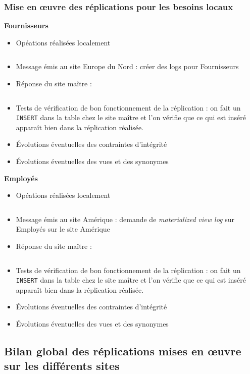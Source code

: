 \documentclass[10pt,a4paper]{article}
\theoremstyle{plain}
\begin{document}
\subsubsection{Mise en \oe uvre des réplications pour les besoins locaux}
\textbf{Fournisseurs}
\begin{itemize}
    \item Opéations réalisées localement
    \inputminted{sql}{EUS_V-A-5-a1.sql}
    \item Message émis au site Europe du Nord : créer des logs pour Fournisseurs 
    \item Réponse du site maître :
\inputminted{sql}{INSA-DB12-EuropeNord-rep-eu-n.sql}
    \item Tests de vérification de bon fonctionnement de la réplication : on fait un \verb|INSERT| dans la table chez le site maître et l'on vérifie que ce qui est inséré apparaît bien dans la réplication réalisée.
    \item Évolutions éventuelles des contraintes d'intégrité
    \item Évolutions éventuelles des vues et des synonymes
\end{itemize}

\textbf{Employés}
\begin{itemize}
    \item Opéations réalisées localement
    \inputminted{sql}{EUS_V-A-5-b1.sql}
    \item Message émis au site Amérique : demande de \emph{materialized view log} sur Employés sur le site Amérique
    \item Réponse du site maître : \inputminted{sql}{EUS_V-A-5-b3.sql}
    \item Tests de vérification de bon fonctionnement de la réplication : on fait un \verb|INSERT| dans la table chez le site maître et l'on vérifie que ce qui est inséré apparaît bien dans la réplication réalisée.
    \item Évolutions éventuelles des contraintes d'intégrité
    \item Évolutions éventuelles des vues et des synonymes
\end{itemize}

\subsection{Bilan global des réplications mises en \oe uvre sur les différents sites}
\end{document}
